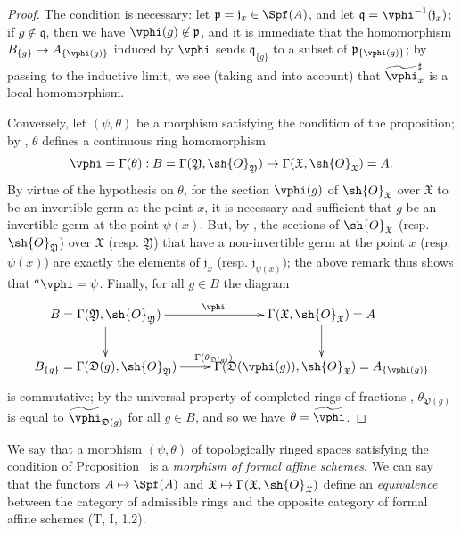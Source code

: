 \begin{proof}
The condition is necessary: let $\mathfrak{p}=\mathfrak{j}_x\in\Spf(A)$, and let $\mathfrak{q}=\vphi^{-1}(\mathfrak{j}_x)$; if $g\not\in\mathfrak{q}$, then we have $\vphi(g)\not\in\mathfrak{p}$, and it is immediate that the homomorphism
$B_{\{g\}}\to A_{\{\vphi(g)\}}$ induced by $\vphi$  sends $\mathfrak{q}_{\{g\}}$ to a subset of $\mathfrak{p}_{\{\vphi(g)\}}$; by passing to the inductive limit, we see (taking  and  into account) that $\widetilde{\vphi}_x^\sharp$ is a local homomorphism.

Conversely, let $(\psi,\theta)$ be a morphism satisfying the condition of the proposition;
by , $\theta$ defines a continuous ring homomorphism
\[
  \vphi=\Gamma(\theta):B=\Gamma(\mathfrak{Y},\sh{O}_\mathfrak{Y})\to\Gamma(\mathfrak{X},\sh{O}_\mathfrak{X})=A.
\]
By virtue of the hypothesis on $\theta$, for the section $\vphi(g)$ of $\sh{O}_\mathfrak{X}$ over $\mathfrak{X}$ to be an invertible germ at the point $x$, it is necessary and sufficient that $g$ be an invertible germ at the point $\psi(x)$.
But, by , the sections of $\sh{O}_\mathfrak{X}$ (resp. $\sh{O}_\mathfrak{Y}$) over $\mathfrak{X}$ (resp. $\mathfrak{Y}$) that have a non-invertible germ at the point $x$ (resp. $\psi(x)$) are exactly the elements of $\mathfrak{j}_x$
(resp. $\mathfrak{j}_{\psi(x)}$);
the above remark thus shows that ${}^a\vphi=\psi$.
Finally, for all $g\in B$ the diagram
\[
  \xymatrix{
    B=\Gamma(\mathfrak{Y},\sh{O}_\mathfrak{Y})\ar[r]^\vphi\ar[d] &
    \Gamma(\mathfrak{X},\sh{O}_\mathfrak{X})=A\ar[d]\\
    B_{\{g\}}=\Gamma(\mathfrak{D}(g),\sh{O}_\mathfrak{Y})\ar[r]^{\Gamma(\theta_{\mathfrak{D}(g)})} &
    \Gamma(\mathfrak{D}(\vphi(g)),\sh{O}_\mathfrak{X})=A_{\{\vphi(g)\}}
  }
\]
is commutative; by the universal property of completed rings of fractions , $\theta_{\mathfrak{D}(g)}$ is equal to $\widetilde{\vphi}_{\mathfrak{D}(g)}$ for all $g\in B$, and so  we have $\theta=\widetilde{\vphi}$.
\end{proof}

We say that a morphism $(\psi,\theta)$ of topologically ringed spaces satisfying the condition of Proposition~ is a \emph{morphism of formal affine schemes}.
We can say that the functors $A\mapsto\Spf(A)$ and $\mathfrak{X}\mapsto\Gamma(\mathfrak{X},\sh{O}_\mathfrak{X})$ define an \emph{equivalence} between the category of admissible rings and the opposite category of formal affine schemes (T, I, 1.2).

